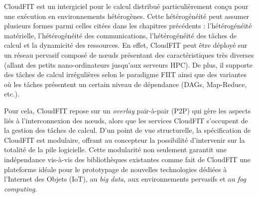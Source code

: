 

\begin{resume}
	
	CloudFIT est un intergiciel pour le calcul distribué particulièrement conçu pour une exécution en environnements hétérogènes. Cette hétérogénéité peut assumer plusieurs formes parmi celles citées dans les chapitres précédents : l'hétérogénéité matérielle, l'hétérogénéité des communications, l'hétérogénéité des tâches de calcul et la dynamicité des ressources. En effet, CloudFIT peut être déployé sur un réseau pervasif composé de n{\oe}uds présentant des caractéristiques très diverses (allant des petits nano-ordinateurs jusqu'aux serveurs HPC). De plus, il supporte des tâches de calcul irrégulières selon le paradigme FIIT ainsi que des variantes où les tâches présentent un certain niveau de dépendance (DAGs, Map-Reduce, etc.).
%	
  
	Pour cela, CloudFIT repose sur un \textit{overlay} pair-à-pair (P2P) qui gère les aspects liés à l'interconnexion des n{\oe}uds, alors que les services CloudFIT s'occupent de la gestion des tâches de calcul. D'un point de vue structurelle, la spécification de CloudFIT est modulaire, offrant au concepteur la possibilité d'intervenir sur la totalité de la pile logicielle. Cette modularité non seulement garantit une indépendance vis-à-vis des bibliothèques existantes comme fait de CloudFIT une plateforme idéale pour le prototypage de nouvelles technologies dédiées à l'Internet des Objets (IoT), au \textit{big data}, aux environnements pervasifs et au \textit{fog computing}.
	

\end{resume}
